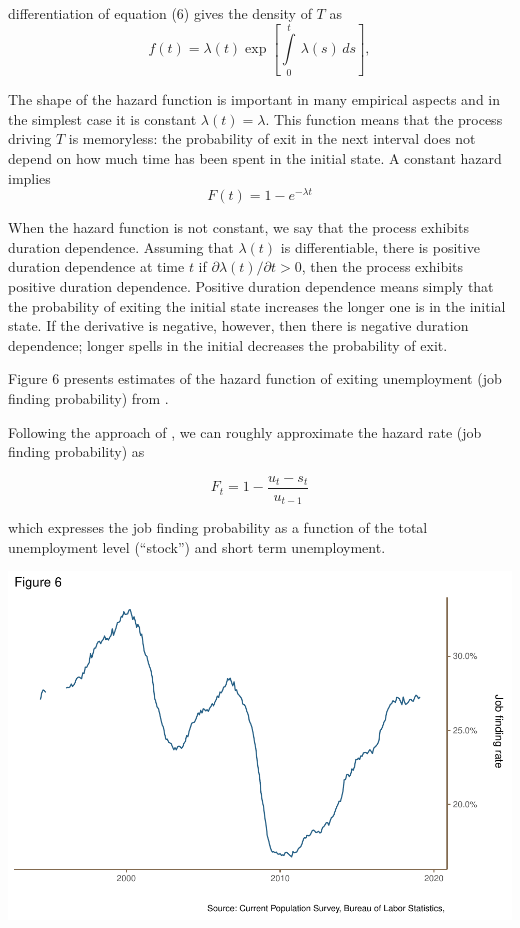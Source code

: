 \documentclass[
  11pt,
]{article}
\begin{document}
differentiation of equation (6) gives the density of \(T\) as
\begin{equation}
f(t) = \lambda(t)\exp\left[\int\limits_{0}^{t}\,\lambda(s)\,ds \right],
\end{equation}

The shape of the hazard function is important in many empirical aspects
and in the simplest case it is constant \(\lambda(t) = \lambda\). This
function means that the process driving \(T\) is memoryless: the
probability of exit in the next interval does not depend on how much
time has been spent in the initial state. A constant hazard implies \[
F(t) = 1 - e^{-\lambda t}
\]

When the hazard function is not constant, we say that the process
exhibits duration dependence. Assuming that \(\lambda(t)\) is
differentiable, there is positive duration dependence at time \(t\) if
\(\partial\lambda(t)/\partial t > 0\), then the process exhibits
positive duration dependence. Positive duration dependence means simply
that the probability of exiting the initial state increases the longer
one is in the initial state. If the derivative is negative, however,
then there is negative duration dependence; longer spells in the initial
decreases the probability of exit.

Figure 6 presents estimates of the hazard function of exiting
unemployment (job finding probability) from \cite{Fallick04}.

Following the approach of \cite{Shimer12}, we can roughly approximate
the hazard rate (job finding probability) as

\begin{equation}
F_{t} = 1 - \frac{u_{t} - s_{t}}{u_{t-1}}
\end{equation}

which expresses the job finding probability as a function of the total
unemployment level (``stock'') and short term unemployment.

\begin{center}\includegraphics{JOLTS_files/figure-latex/unnamed-chunk-10-1} \end{center}
\end{document}
